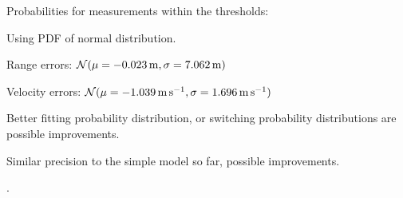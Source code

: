 \begin{compactitem}
\begin{compactitem}
\begin{compactitem}
        \item Probabilities for measurements within the thresholds:
        \begin{compactitem}
            \item Using PDF of normal distribution.
            \item Range errors:
                  \(\operatorname{\mathcal{N}}(\mu = \SI{-0.023}{\meter}, \sigma = \SI{7.062}{\meter})\)
            \item Velocity errors:
                  \(\operatorname{\mathcal{N}}(\mu = \SI{-1.039}{\meter\per\second}, \sigma = \SI{1.696}{\meter\per\second})\)
            \item Better fitting probability distribution, or switching probability distributions are possible improvements.
            \item {}
        \end{compactitem}
    \end{compactitem}

    \item
    Similar precision to the simple model so far, possible improvements.

    \item
    .
\end{compactitem}
\end{compactitem}
